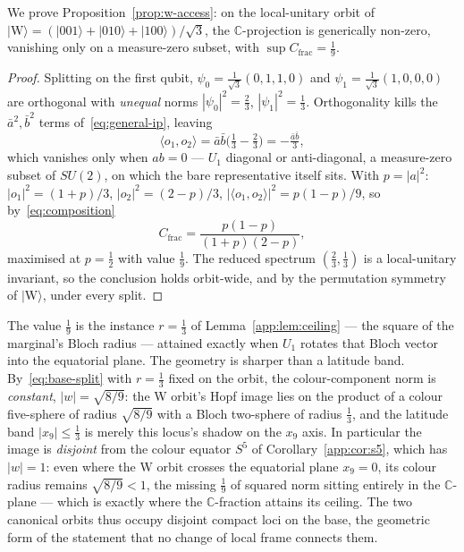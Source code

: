 We prove Proposition~\ref{prop:w-access}: on the local-unitary orbit of
$\lvert\mathrm{W}\rangle = (\lvert001\rangle+\lvert010\rangle+\lvert100\rangle)/\sqrt3$, the
$\mathbb{C}$-projection is generically non-zero, vanishing only on a measure-zero subset, with
$\sup C_{\mathrm{frac}} = \tfrac19$.

\begin{proof}
Splitting on the first qubit, $\psi_0 = \tfrac1{\sqrt3}(0,1,1,0)$ and
$\psi_1 = \tfrac1{\sqrt3}(1,0,0,0)$ are orthogonal with \emph{unequal} norms
$|\psi_0|^2 = \tfrac23$, $|\psi_1|^2 = \tfrac13$. Orthogonality kills the $\bar a^2,\bar b^2$ terms
of~\eqref{eq:general-ip}, leaving
\begin{equation}
  \langle o_1,o_2\rangle = \bar a\bar b\bigl(\tfrac13-\tfrac23\bigr) = -\tfrac{\bar a\bar b}{3},
\end{equation}
which vanishes only when $ab = 0$ --- $U_1$ diagonal or anti-diagonal, a measure-zero subset of
$SU(2)$, on which the bare representative itself sits. With $p = |a|^2$:
$|o_1|^2 = (1+p)/3$, $|o_2|^2 = (2-p)/3$, $|\langle o_1,o_2\rangle|^2 = p(1-p)/9$, so
by~\eqref{eq:composition}
\begin{equation}
  C_{\mathrm{frac}} = \frac{p(1-p)}{(1+p)(2-p)},
  \label{eq:wcfrac}
\end{equation}
maximised at $p = \tfrac12$ with value $\tfrac19$. The reduced spectrum $(\tfrac23,\tfrac13)$ is a
local-unitary invariant, so the conclusion holds orbit-wide, and by the permutation symmetry of
$\lvert\mathrm{W}\rangle$, under every split.
\end{proof}

The value $\tfrac19$ is the instance $r = \tfrac13$ of Lemma~\ref{app:lem:ceiling} --- the square of
the marginal's Bloch radius --- attained exactly when $U_1$ rotates that Bloch vector into the
equatorial plane. The geometry is sharper than a latitude band. By~\eqref{eq:base-split} with
$r = \tfrac13$ fixed on the orbit, the colour-component norm is \emph{constant},
$|w| = \sqrt{8/9}$: the W orbit's Hopf image lies on the product of a colour five-sphere of radius
$\sqrt{8/9}$ with a Bloch two-sphere of radius $\tfrac13$, and the latitude band
$|x_9|\le\tfrac13$ is merely this locus's shadow on the $x_9$ axis. In particular the image is
\emph{disjoint} from the colour equator $S^5$ of Corollary~\ref{app:cor:s5}, which has $|w| = 1$:
even where the W orbit crosses the equatorial plane $x_9 = 0$, its colour radius remains
$\sqrt{8/9} < 1$, the missing $\tfrac19$ of squared norm sitting entirely in the $\mathbb{C}$-plane
--- which is exactly where the $\mathbb{C}$-fraction attains its ceiling. The two canonical orbits
thus occupy disjoint compact loci on the base, the geometric form of the statement that no change of
local frame connects them.

